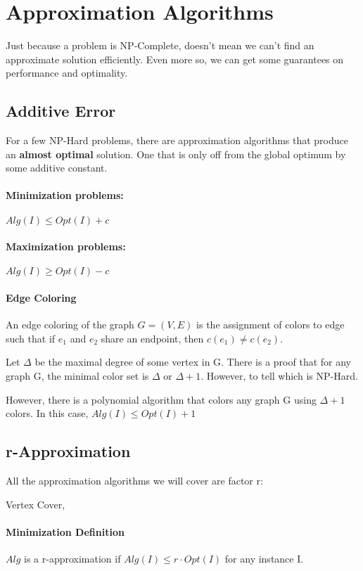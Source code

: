 \documentclass[a4paper]{article}
\begin{document}
\section{Approximation Algorithms}
Just because a problem is NP-Complete, doesn't mean we can't find an approximate solution efficiently. Even more so, we can get some guarantees on performance and optimality.

\subsection{Additive Error}
For a few NP-Hard problems, there are approximation algorithms that produce an {\bf almost optimal} solution. One that is only off from the global optimum by some additive constant.

\paragraph{Minimization problems:}
$Alg(I)\le Opt(I) + c$

\paragraph{Maximization problems:}
$Alg(I)\ge Opt(I) - c$

\paragraph{Edge Coloring}
An edge coloring of the graph $G=(V,E)$ is the assignment of colors to edge such that if $e_1$ and $e_2$ share an endpoint, then $c(e_1) \ne c(e_2)$.

Let $\Delta$ be the maximal degree of some vertex in G. There is a proof that for any graph G, the minimal color set is $\Delta$ or $\Delta + 1$. However, to tell which is NP-Hard.

However, there is a polynomial algorithm that colors any graph G using $\Delta + 1$ colors. In this case, $Alg(I) \le Opt(I) + 1$

\subsection{r-Approximation}
All the approximation algorithms we will cover are factor r:

Vertex Cover, 

\paragraph{Minimization Definition}
$Alg$ is a r-approximation if $Alg(I) \le r \cdot Opt(I)$ for any instance I.
\end{document}
